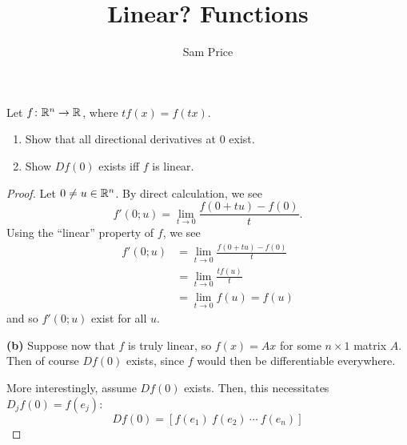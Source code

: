 \documentclass{article}
\author{Sam Price}
\title{Linear? Functions}
\begin{document}
\maketitle

\begin{proposition}{}{}
  Let $f \from \RR[n] \to \RR$, where $tf(x) = f(tx)$.
  \begin{enumerate}[start=1,label={(\alph*)}]
    \item Show that all directional derivatives at 0 exist.
    \item Show $Df(0)$ exists iff $f$ is linear.
  \end{enumerate}
\end{proposition}
\begin{proof}
  Let $0 \ne u \in \RR[n]$. By direct calculation, we see
  \[ f'(0; u) = \lim_{t \to 0} \frac{f(0 + tu) - f(0)}{t}. \]
  Using the ``linear'' property of $f$, we see
  \begin{align*}
    f'(0; u) &= \lim_{t \to 0} \frac{f(0 + tu) - f(0)}{t}\\
             &= \lim_{t \to 0} \frac{tf(u)}{t}\\
             &= \lim_{t \to 0} f(u) = f(u)
  \end{align*}
  and so $f'(0; u)$ exist for all $u$.

  \textbf{(b)}
  Suppose now that $f$ is truly linear, so $f(x) = Ax$ for some $n \times 1$ matrix $A$.
  Then of course $Df(0)$ exists, since $f$ would then be differentiable everywhere.

  More interestingly, assume $Df(0)$ exists.
  Then, this necessitates $D_{j}f(0) = f(e_{j})$:
  \[ Df(0) = [ f(e_{1}) \ f(e_{2}) \ \cdots \ f(e_{n}) ] \]
\end{proof}
\end{document}
